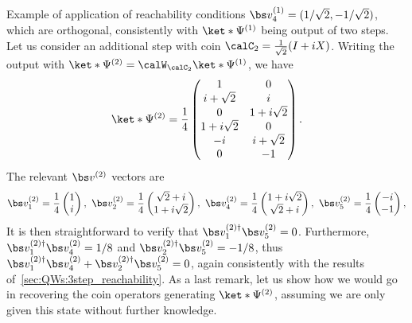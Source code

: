\begin{examplebox}[label=ex:QWs:conditions_few_steps]{Example of application of reachability conditions}
    $\bs v^{(1)}_4=(1/\sqrt2, -1/\sqrt2)$,
    which are orthogonal, consistently with $\ket*{\Psi^{(1)}}$ being output of two steps.
    Let us consider an additional step with coin $\calC_2=\frac{1}{\sqrt2}(I + iX)$.
    Writing the output with $\ket*{\Psi^{(2)}}=\calW_{\calC_2}\ket*{\Psi^{(1)}}$, we have
    \begin{equation}
        \ket*{\Psi^{(2)}} = \frac{1}{4}
        \begin{pmatrix}
            1 & 0 \\
            i + \sqrt2 & i \\
            0 & 1 + i\sqrt2 \\
            1 + i\sqrt2 & 0 \\
            -i & i + \sqrt2 \\
            0 & -1
        \end{pmatrix}.
    \end{equation}
    The relevant $\bs v^{(2)}$ vectors are
    \begin{equation}
    \begin{aligned}
        \bs v^{(2)}_1 = \frac{1}{4}\begin{pmatrix} 1 \\ i \end{pmatrix},
        \,\,
        \bs v^{(2)}_2 = \frac{1}{4}\begin{pmatrix} \sqrt2 + i \\ 1 + i\sqrt2 \end{pmatrix},
        \,\,
        \bs v^{(2)}_4 = \frac{1}{4}\begin{pmatrix} 1 + i\sqrt2\\ \sqrt2 + i \end{pmatrix},
        \,\,
        \bs v^{(2)}_5 = \frac{1}{4}\begin{pmatrix} -i \\ -1 \end{pmatrix},
    \end{aligned}
    \end{equation}
    It is then straightforward to verify that
    $\bs v_1^{(2)\dagger}\bs v_5^{(2)} = 0$.
    Furthermore,
    $\bs v_1^{(2)\dagger}\bs v_4^{(2)} = 1/8$
    and $\bs v_2^{(2)\dagger}\bs v_5^{(2)} = -1/8$,
    thus 
    $\bs v_1^{(2)\dagger}\bs v_4^{(2)} + \bs v_2^{(2)\dagger}\bs v_5^{(2)} = 0$,
    again consistently with the results of~\cref{sec:QWs:3step_reachability}.
    As a last remark, let us show how we would go in recovering the coin operators generating $\ket*{\Psi^{(2)}}$, assuming we are only given this state without further knowledge.

\end{examplebox}

